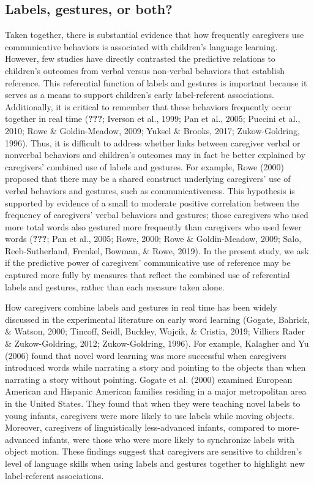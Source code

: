 \documentclass[
  english,
  man,floatsintext]{apa6}
\begin{document}
\hypertarget{labels-gestures-or-both}{%
\subsection{Labels, gestures, or both?}\label{labels-gestures-or-both}}

Taken together, there is substantial evidence that how frequently caregivers use communicative behaviors is associated with children's language learning. However, few studies have directly contrasted the predictive relations to children's outcomes from verbal versus non-verbal behaviors that establish reference. This referential function of labels and gestures is important because it serves as a means to support children's early label-referent associations. Additionally, it is critical to remember that these behaviors frequently occur together in real time ({\textbf{???}}; Iverson et al., 1999; Pan et al., 2005; Puccini et al., 2010; Rowe \& Goldin-Meadow, 2009; Yuksel \& Brooks, 2017; Zukow-Goldring, 1996). Thus, it is difficult to address whether links between caregiver verbal or nonverbal behaviors and children's outcomes may in fact be better explained by caregivers' combined use of labels and gestures. For example, Rowe (2000) proposed that there may be a shared construct underlying caregivers' use of verbal behaviors and gestures, such as communicativeness. This hypothesis is supported by evidence of a small to moderate positive correlation between the frequency of caregivers' verbal behaviors and gestures; those caregivers who used more total words also gestured more frequently than caregivers who used fewer words ({\textbf{???}}; Pan et al., 2005; Rowe, 2000; Rowe \& Goldin-Meadow, 2009; Salo, Reeb-Sutherland, Frenkel, Bowman, \& Rowe, 2019). In the present study, we ask if the predictive power of caregivers' communicative use of reference may be captured more fully by measures that reflect the combined use of referential labels and gestures, rather than each measure taken alone.

How caregivers combine labels and gestures in real time has been widely discussed in the experimental literature on early word learning (Gogate, Bahrick, \& Watson, 2000; Tincoff, Seidl, Buckley, Wojcik, \& Cristia, 2019; Villiers Rader \& Zukow-Goldring, 2012; Zukow-Goldring, 1996). For example, Kalagher and Yu (2006) found that novel word learning was more successful when caregivers introduced words while narrating a story and pointing to the objects than when narrating a story without pointing. Gogate et al. (2000) examined European American and Hispanic American families residing in a major metropolitan area in the United States. They found that when they were teaching novel labels to young infants, caregivers were more likely to use labels while moving objects. Moreover, caregivers of linguistically less-advanced infants, compared to more-advanced infants, were those who were more likely to synchronize labels with object motion. These findings suggest that caregivers are sensitive to children's level of language skills when using labels and gestures together to highlight new label-referent associations.
\end{document}
